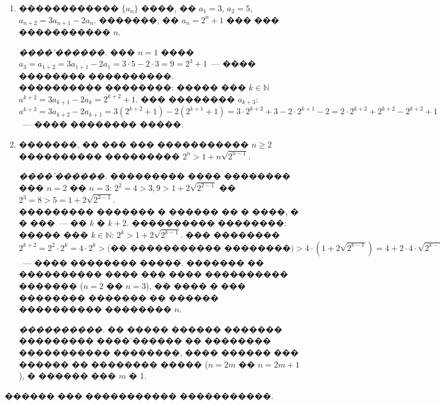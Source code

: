 \documentclass[a4paper,12pt]{article}
\begin{document}
\begin{enumerate}
\item ������������ $\{a_{n}\}$ ����, �� $a_{1} = 3$, $a_{2} = 5$, $a_{n+2} = 3a_{n+1}- 2a_{n}$. �������, �� $a_{n} = 2^{n}+ 1$ ��� ��� ����������� $n$.

\textit{����'������.} ��� $n=1$ ���� $a_{3} = a_{1+2} = 3a_{1+1}- 2a_{1} = 3\cdot 5 - 2\cdot 3 = 9 = 2^{3} + 1$~--- ���� �������� ����������.\\
���������� ��������: ����� ��� $k\in \mathbb{N}$ $a^{k+2} = 3a_{k+1}- 2a_{k} = 2^{k+2} + 1$. ��� �������� $a_{k+3}$: $a^{k+3} = 3a_{k+2}- 2a_{k+1} = 3(2^{k+2} + 1) - 2(2^{k+1} + 1) = 3\cdot2^{k+2} + 3 - 2\cdot2^{k+1} - 2 = 2\cdot2^{k+2}+2^{k+2}-2^{k+2}+1=2^{k+3}+1$~--- ���� �������� �����.

\item �������, �� ��� ��� ����������� $n \geq 2$ ���������� ��������� $2^{n}>1+n\sqrt{2^{n-1}}$.

\textit{����'������.} ��������� ���� �������� ��� $n=2$ �� $n=3$: $2^{2} = 4>3,9>1+2\sqrt{2^{2-1}}$ �� $2^{3} = 8>5=1+2\sqrt{2^{3-1}}$.\\
��������� ������� � ������ �� � ����, � � ���~--- �� $k$ � $k+2$. ���������� ��������: ����� ��� $k\in \mathbb{N}$: $2^{k} >1+2\sqrt{2^{k-1}}$. ��� �������� $2^{k+2}= 2^{2}\cdot 2^{k}= 4\cdot 2^{k} >\textit{(�� ����������� ��������)} > 4\cdot(1+2\sqrt{2^{k-1}})= 4+2\cdot 4\cdot \sqrt{2^{k-1}} = 4+2\cdot  \sqrt{2^{k+1}}> 1+2\cdot  \sqrt{2^{k+1}}$~--- ���� �������� �����. ������� �� ���������� ���� ��� ���� ���������� ������� ($n=2$ �� $n=3$), �� ���� � ��� �������� ������� �� ������ ���������� �������� $n$.

\textit{����������.} �� ����� ������ ������� ��������� ����'������ �� �������� ����������� ��������, ���� ������ ��� ������ �� �������� ����� ($n=2m$ �� $n=2m+1$), � ������ ��� $m$ � 1.

\end{enumerate}
������ ��� ����������� �����������.
\end{document}
